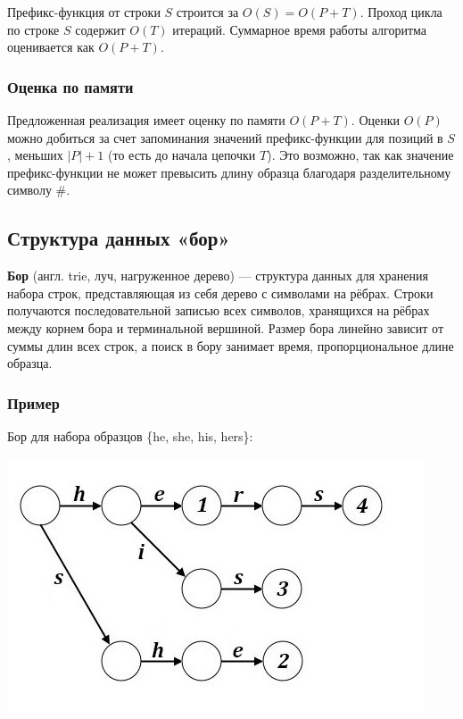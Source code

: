 Префикс-функция от строки $S$ строится за $O(S)=O(P+T)$.
Проход цикла по строке $S$ содержит $O(T)$ итераций.
Суммарное время работы алгоритма оценивается как $O(P+T)$. 

\subsubsection{Оценка по памяти}

Предложенная реализация имеет оценку по памяти $O(P+T)$.
Оценки $O(P)$ можно добиться за счет запоминания значений префикс-функции для позиций в $S$, меньших $|P|+1$ (то есть до начала цепочки $T$).
Это возможно, так как значение префикс-функции не может превысить длину образца благодаря разделительному символу $\#$. 

\subsection{Структура данных «бор»}

\begin{definition}
    \textbf{Бор} (англ. trie, луч, нагруженное дерево) --- структура данных для хранения набора строк, представляющая из себя дерево с символами на рёбрах.
    Строки получаются последовательной записью всех символов, хранящихся на рёбрах между корнем бора и терминальной вершиной.
    Размер бора линейно зависит от суммы длин всех строк, а поиск в бору занимает время, пропорциональное длине образца. 
\end{definition}

\subsubsection{Пример}

Бор для набора образцов \{he, she, his, hers\}:

\includegraphics[]{img/9_1.jpg}

